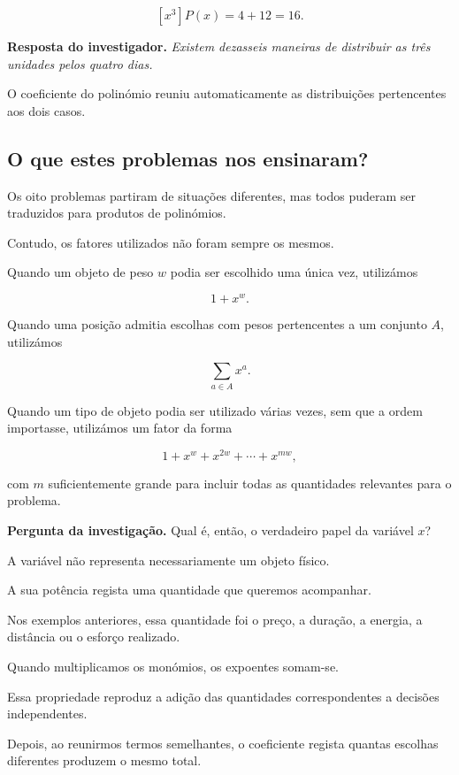 \documentclass[11pt,a4paper,oneside]{book}
\newcommand{\Pergunta}[1]{\begin{perguntabox}\textbf{Pergunta da investigação.} #1\end{perguntabox}}
\newcommand{\Resposta}[1]{\textcolor{verdeescuro}{\textbf{Resposta do investigador.}} \emph{#1}\par}
\begin{document}
\[
[x^3]P(x)=4+12=\boxed{16}.
\]

\Resposta{Existem dezasseis maneiras
de distribuir as três unidades
pelos quatro dias.}

O coeficiente do polinómio
reuniu automaticamente as
distribuições pertencentes
aos dois casos.

\subsection{O que estes problemas nos ensinaram?}

Os oito problemas partiram de situações
diferentes, mas todos puderam ser
traduzidos para produtos de polinómios.

Contudo, os fatores utilizados
não foram sempre os mesmos.

Quando um objeto de peso $w$
podia ser escolhido uma única vez,
utilizámos

\[
1+x^w.
\]

Quando uma posição admitia
escolhas com pesos pertencentes
a um conjunto $A$, utilizámos

\[
\sum_{a\in A}x^a.
\]

Quando um tipo de objeto podia
ser utilizado várias vezes,
sem que a ordem importasse,
utilizámos um fator da forma

\[
1+x^w+x^{2w}+\cdots+x^{mw},
\]

com $m$ suficientemente grande
para incluir todas as quantidades
relevantes para o problema.

\Pergunta{Qual é, então, o verdadeiro
papel da variável $x$?}

A variável não representa necessariamente
um objeto físico.

A sua potência regista uma quantidade
que queremos acompanhar.

Nos exemplos anteriores, essa quantidade
foi o preço, a duração, a energia,
a distância ou o esforço realizado.

Quando multiplicamos os monómios,
os expoentes somam-se.

Essa propriedade reproduz a adição
das quantidades correspondentes
a decisões independentes.

Depois, ao reunirmos termos semelhantes,
o coeficiente regista quantas escolhas
diferentes produzem o mesmo total.
\end{document}
